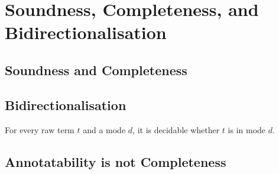
\section{Soundness, Completeness, and Bidirectionalisation} \label{sec:annotatability}

\subsection{Soundness and Completeness}
\begin{theorem}[Soundness]\label{thm:term-soundness}
    
\end{theorem}



\begin{theorem}[Completeness]\label{thm:term-completeness}
    
\end{theorem}

\subsection{Bidirectionalisation}
\begin{proposition} \label{thm:bidirectionalisation}
  For every raw term $t$ and a mode $d$, it is decidable whether $t$ is in mode $d$.
\end{proposition}

\subsection{Annotatability is not Completeness}

